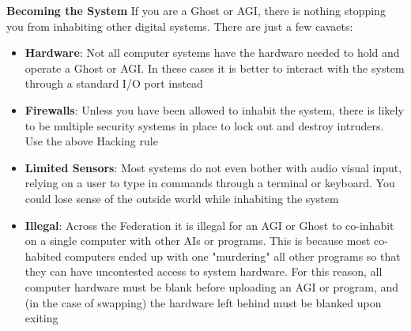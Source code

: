\begin{commentbox}{\textbf{Becoming the System}}
If you are a Ghost or AGI, there is nothing stopping you from inhabiting other digital systems. There are just a few cavaets:
  \begin{itemize}
    \item \textbf{Hardware}: Not all computer systems have the hardware needed to hold and operate a Ghost or AGI. In these cases it is better to interact with the system through a standard I/O port instead\\
    \item \textbf{Firewalls}: Unless you have been allowed to inhabit the system, there is likely to be multiple security systems in place to lock out and destroy intruders. Use the above Hacking rule\\
    \item \textbf{Limited Sensors}: Most systems do not even bother with audio visual input, relying on a user to type in commands through a terminal or keyboard. You could lose sense of the outside world while inhabiting the system\\
    \item \textbf{Illegal}: Across the Federation it is illegal for an AGI or Ghost to co-inhabit on a single computer with other AIs or programs. This is because most co-habited computers ended up with one "murdering" all other programs so that they can have uncontested access to system hardware. For this reason, all computer hardware must be blank before uploading an AGI or program, and (in the case of swapping) the hardware left behind must be blanked upon exiting\\
  \end{itemize}
\end{commentbox}
